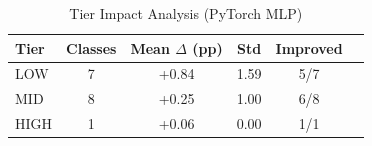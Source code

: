 \begin{table}[htbp]
\centering
\caption{Tier Impact Analysis (PyTorch MLP)}
\label{tab:pytorch_tier}
\begin{tabular}{lccccc}
\toprule
Tier & Classes & Mean $\Delta$ (pp) & Std & Improved \\
\midrule
LOW & 7 & +0.84 & 1.59 & 5/7 \\
MID & 8 & +0.25 & 1.00 & 6/8 \\
HIGH & 1 & +0.06 & 0.00 & 1/1 \\
\bottomrule
\end{tabular}
\end{table}